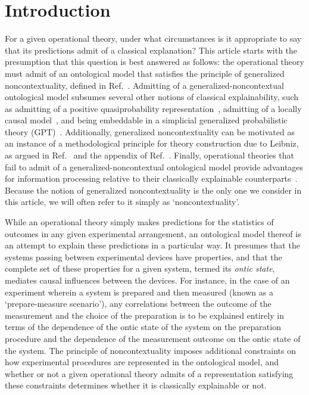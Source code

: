 \documentclass[onecolum,aps,groupedaddress,nofootinbib]{revtex4-2}
\begin{document}
\maketitle

\newpage
{
  \tableofcontents
}
\newpage

\section{Introduction}

For a given operational theory, under what circumstances is it appropriate to say that its predictions admit of a classical explanation? This article starts with the presumption that this question is best answered as follows:
the operational theory must admit of an ontological model that satisfies the principle of generalized noncontextuality, defined in Ref.~\cite{Spekkens2005}.
Admitting of a generalized-noncontextual ontological model subsumes several other notions of classical explainability,
such as admitting of a positive quasiprobability representation~\cite{Spekkens2008,ferrie2008frame}, admitting of a locally causal model~\cite{Bell,Bellreview}, and being embeddable in a simplicial generalized probabilistic theory (GPT)~\cite{schmid2019characterization,shahandeh2019contextuality}.   Additionally, generalized noncontextuality can be motivated as an instance of a methodological principle for theory construction due to Leibniz, as argued in Ref.~\cite{Leibniz} and the appendix of Ref.~\cite{Mazurek2016}.
Finally, operational theories that fail to admit of a generalized-noncontextual ontological model provide advantages for information processing relative to their classically explainable counterparts~\cite{POM,RAC,RAC2,Saha_2019,saha2019preparation,MESD,Lostaglio2020contextualadvantage,magic,comp1,comp2}.  Because the notion of generalized noncontextuality is the only one we consider in this article, we will often refer to it simply as `noncontextuality'.


While an operational theory simply makes predictions for the statistics of outcomes in any given experimental arrangement, an ontological model thereof is an attempt to explain these predictions in a particular way.  It presumes that the systems passing between experimental devices have properties, and that the complete set of these properties for a given system, termed its {\em ontic state}, mediates causal influences between the devices.  For instance, in the case of an experiment wherein a system is prepared and then measured (known as a `prepare-measure scenario'), any correlations between the outcome of the measurement and the choice of the preparation is to be explained entirely in terms of the dependence of the ontic state of the system on the preparation procedure and the dependence of the measurement outcome on the ontic state of the system.
The principle of noncontextuality imposes additional constraints on how experimental procedures are represented in the ontological model, and whether or not a given operational theory admits of a representation satisfying these constraints determines whether it is classically explainable or not.
\end{document}
